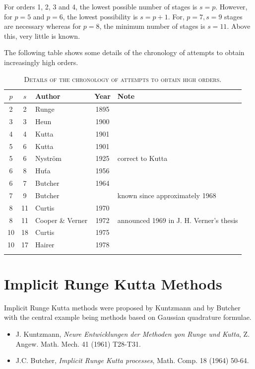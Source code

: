 \documentclass[a4paper,oneside]{book}
\numberwithin{equation}{chapter}
\begin{document}
For orders 1, 2, 3 and 4, the lowest possible number of stages is $s=p$. However, for $p=5$ and $p=6$, the lowest possibility is $s=p+1$. For, $p=7,s=9$ stages are necessary whereas for $p=8$, the minimum number of stages is $s=11$. Above this, very little is known.

The following table shows some details of the chronology of attempts to obtain increasingly high orders.
\begin{center}
\begin{longtable}{|c|c|l|c|l|}
\hline
$p$ & $s$ & Author & Year & Note\\
\hline
2 & 2 & Runge & 1895 & \\
3 & 3 & Heun & 1900 & \\
4 & 4 & Kutta & 1901 & \\
5 & 6 & Kutta & 1901 & \\
5 & 6 & Nystr\"{o}m & 1925 & correct to Kutta\\
6 & 8 & Hu\v{t}a & 1956 & \\
6 & 7 & Butcher & 1964 & \\
7 & 9 & Butcher & & known since approximately 1968\\
8 & 11 & Curtis & 1970 & \\
8 & 11 & Cooper \& Verner & 1972 & announced  1969 in J. H. Verner's thesis\\
10 & 18  & Curtis & 1975 & \\
10 & 17 & Hairer & 1978 & \\
\hline
\caption{\textsc{Details of the chronology of attempts to obtain high orders.}}
\end{longtable}
\end{center}
\section{Implicit Runge Kutta Methods}
Implicit Runge Kutta methods were proposed by Kuntzmann and by Butcher with the central example being methods based on Gaussian quadrature formulae. 
\begin{itemize}
\item J. Kuntzmann, \textit{Neure Entwicklungen der Methoden yon Runge und Kutta}, Z. Angew. Math. Mech. 41 (1961) T28-T31.
\item J.C. Butcher, \textit{Implicit Runge Kutta processes}, Math. Comp. 18 (1964) 50-64.
\end{itemize}
\end{document}
